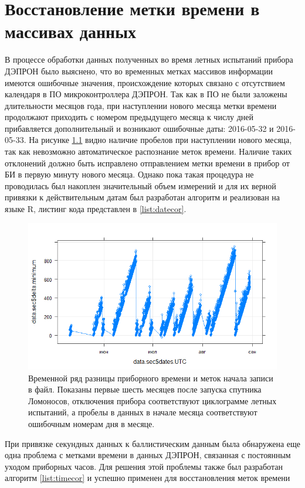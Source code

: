 \documentclass[a4paper,14pt]{extreport}
\begin{document}
	\chapter{Восстановление метки времени в массивах данных}

	В процессе обработки данных полученных во время летных испытаний прибора ДЭПРОН 
	было выяснено, что во временных метках массивов информации имеются ошибочные 
	значения, происхождение которых связано с отсутствием календаря в ПО 
	микроконтроллера ДЭПРОН. Так как в ПО не были заложены длительности месяцов 
	года, при наступлении нового месяца метки времени продолжают приходить с 
	номером предыдущего месяца к числу дней прибавляется дополнительный и возникают 
	ошибочные даты: 2016-05-32 и 2016-05-33. На рисунке 
	\ref{fig:deprontimedifference} видно наличие пробелов при наступлении нового 
	месяца, так как невозможно автоматическое распознание меток времени. Наличие 
	таких отклонений должно быть 
	исправлено отправлением метки времени в прибор от БИ в первую минуту нового 
	месяца. Однако пока такая процедура не проводилась был накоплен значительный 
	объем измерений и для их верной привязки к действительным датам был разработан 
	алгоритм и реализован на языке R, листинг кода представлен в \ref{list:datecor}.
	
	\begin{figure}
		\centering
		\includegraphics[width=0.8\linewidth]{images/deprontimedifference}
		\caption[Временной ряд разницы приборного времени и меток начала записи в 
		файл.]{Временной ряд разницы приборного времени и меток начала записи в 
			файл. Показаны первые шесть месяцев после запуска спутника Ломоносов, 
			отключения прибора соответствуют циклограмме летных испытаний, а 
			пробелы в данных в начале месяца соответствуют ошибочным номерам дня в 
			месяце.}
		\label{fig:deprontimedifference}
	\end{figure}
	
	При привязке секундных данных к баллистическим данным была обнаружена еще одна 
	проблема с метками времени в данных 
	ДЭПРОН, связанная с постоянным уходом приборных часов. Для решения этой 
	проблемы также был разработан алгоритм \ref{list:timecor} и успешно применен 
	для восстановления меток времени 
	
\end{document}

